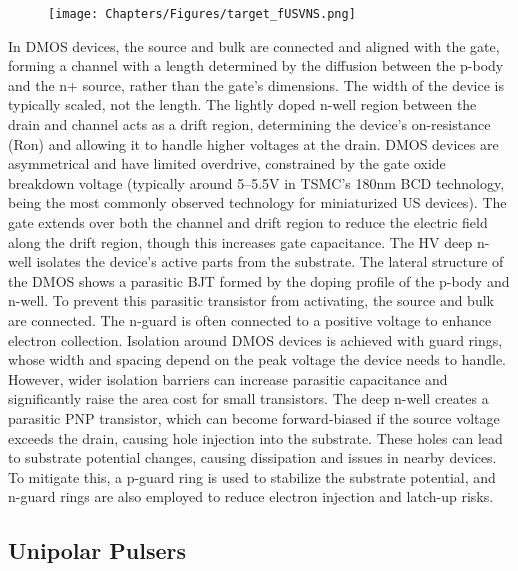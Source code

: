 \begin{figure}[ht]
  \centering
  \texttt{[image: Chapters/Figures/target\_fUSVNS.png]}
  \label{fig:bcd_technology}
\end{figure}

\par
In DMOS devices, the source and bulk are connected and aligned with the gate, forming a channel with a length determined by the diffusion between the p-body and the n+ source, rather than the gate's dimensions. The width of the device is typically scaled, not the length. The lightly doped n-well region between the drain and channel acts as a drift region, determining the device’s on-resistance (Ron) and allowing it to handle higher voltages at the drain. DMOS devices are asymmetrical and have limited overdrive, constrained by the gate oxide breakdown voltage (typically around 5–5.5V in TSMC's 180nm BCD technology, being the most commonly observed technology for miniaturized US devices). The gate extends over both the channel and drift region to reduce the electric field along the drift region, though this increases gate capacitance. The HV deep n-well isolates the device’s active parts from the substrate. The lateral structure of the DMOS shows a parasitic BJT formed by the doping profile of the p-body and n-well. To prevent this parasitic transistor from activating, the source and bulk are connected. The n-guard is often connected to a positive voltage to enhance electron collection. Isolation around DMOS devices is achieved with guard rings, whose width and spacing depend on the peak voltage the device needs to handle. However, wider isolation barriers can increase parasitic capacitance and significantly raise the area cost for small transistors. The deep n-well creates a parasitic PNP transistor, which can become forward-biased if the source voltage exceeds the drain, causing hole injection into the substrate. These holes can lead to substrate potential changes, causing dissipation and issues in nearby devices.   To mitigate this, a p-guard ring is used to stabilize the substrate potential, and n-guard rings are also employed to reduce electron injection and latch-up risks. 


\subsection{Unipolar Pulsers}
\label{subsec:unipolar_pulsers}

